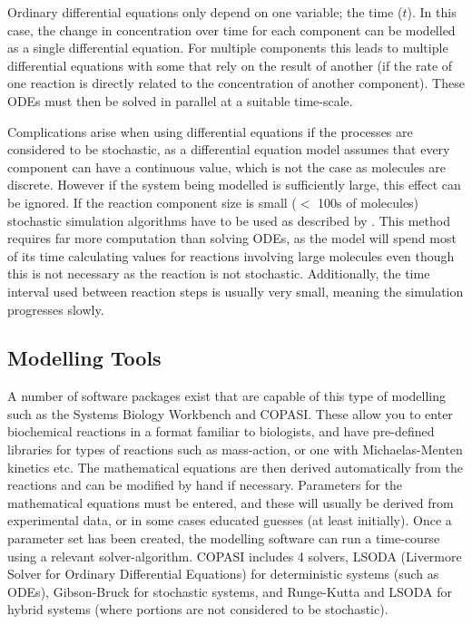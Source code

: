 Ordinary differential equations only depend on one variable; the time ($t$). In this case, the change in concentration over time for each component can be modelled as a single differential equation. For multiple components this leads to multiple differential equations with some that rely on the result of another (if the rate of one reaction is directly related to the concentration of another component). These ODEs must then be solved in parallel at a suitable time-scale.

Complications arise when using differential equations if the processes are considered to be stochastic, as a differential equation model assumes that every component can have a continuous value, which is not the case as molecules are discrete. However if the system being modelled is sufficiently large, this effect can be ignored. If the reaction component size is small ($<$ 100s of molecules) stochastic simulation algorithms have to be used as described by \citet{Gillespie1977}. This method requires far more computation than solving ODEs, as the model will spend most of its time calculating values for reactions involving large molecules even though this is not necessary as the reaction is not stochastic. Additionally, the time interval used between reaction steps is usually very small, meaning the simulation progresses slowly\cite{Klipp2005}.

\subsection{Modelling Tools}

A number of software packages exist that are capable of this type of modelling such as the Systems Biology Workbench\cite{Sauro2003} and COPASI\cite{Hoops2006}. These allow you to enter biochemical reactions in a format familiar to biologists, and have pre-defined libraries for types of reactions such as mass-action, or one with Michaelas-Menten kinetics etc. The mathematical equations are then derived automatically from the reactions and can be modified by hand if necessary. Parameters for the mathematical equations must be entered, and these will usually be derived from experimental data, or in some cases educated guesses (at least initially). Once a parameter set has been created, the modelling software can run a time-course using a relevant solver-algorithm. COPASI includes 4 solvers,  LSODA (Livermore Solver for Ordinary Differential Equations)\cite{Radhakrishnan1993} for deterministic systems (such as ODEs), Gibson-Bruck\cite{Gibson2000} for stochastic systems, and Runge-Kutta and LSODA for hybrid systems (where portions are not considered to be stochastic).

